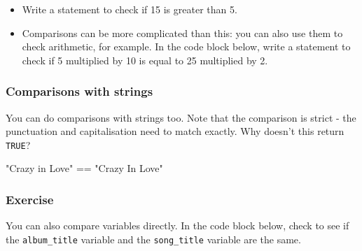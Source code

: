 \documentclass[
  letterpaper,
  DIV=11,
  numbers=noendperiod]{scrreprt}
\newenvironment{Shaded}{\begin{snugshade}}{\end{snugshade}}
\newcommand{\NormalTok}[1]{\textcolor[rgb]{0.00,0.23,0.31}{#1}}
\providecommand{\tightlist}{%
  \setlength{\itemsep}{0pt}\setlength{\parskip}{0pt}}
\begin{document}
\begin{itemize}
\tightlist
\item
  Write a statement to check if 15 is greater than 5.
\end{itemize}

\begin{Shaded}
\begin{Highlighting}[]

\end{Highlighting}
\end{Shaded}

\begin{itemize}
\tightlist
\item
  Comparisons can be more complicated than this: you can also use them
  to check arithmetic, for example. In the code block below, write a
  statement to check if 5 multiplied by 10 is equal to 25 multiplied by
  2.
\end{itemize}

\begin{Shaded}
\begin{Highlighting}[]


\end{Highlighting}
\end{Shaded}

\subsubsection{Comparisons with strings}\label{comparisons-with-strings}

You can do comparisons with strings too. Note that the comparison is
strict - the punctuation and capitalisation need to match exactly. Why
doesn't this return \texttt{TRUE}?

\begin{Shaded}
\begin{Highlighting}[]
\NormalTok{"Crazy in Love" == "Crazy In Love"}
\end{Highlighting}
\end{Shaded}

\subsubsection{Exercise}\label{exercise}

You can also compare variables directly. In the code block below, check
to see if the \texttt{album\_title} variable and the
\texttt{song\_title} variable are the same.

\begin{Shaded}
\begin{Highlighting}[]

\end{Highlighting}
\end{Shaded}
\end{document}
